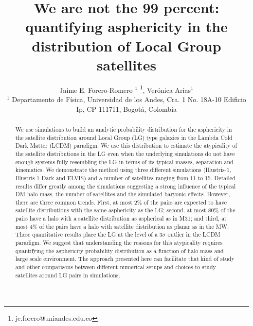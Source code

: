 \documentclass[a4paper,fleqn,usenatbib]{mnras}
\begin{document}
\title[LG satellites distribution asphericity]{We are not the 99 percent: quantifying
  asphericity in the distribution of Local Group satellites}
\author[J.E. Forero-Romero \& V. Arias]
{Jaime E. Forero-Romero $^{1}$ \thanks{je.forero@uniandes.edu.co},
Ver\'onica Arias$^1$\\
$^1$ Departamento de F\'isica, Universidad de los Andes, Cra. 1
  No. 18A-10 Edificio Ip, CP 111711, Bogot\'a, Colombia \\
}

\maketitle

\begin{abstract}
We use simulations to build an analytic probability distribution for
the asphericity in the satellite distribution around Local Group (LG)
type galaxies in the Lambda Cold Dark Matter (LCDM) paradigm. 
We use this distribution to estimate the  atypicality
of the satellite distributions in the LG even when the underlying
simulations do not have enough systems fully resembling the LG in
terms of its typical masses, separation and kinematics.
We demonstrate the method using three different simulations
(Illustris-1,  Illustris-1-Dark and ELVIS) and a number of satellites
ranging from 11 to 15.
Detailed results differ greatly among the simulations suggesting a
strong influence of the typical DM halo mass, the number of satellites
and the simulated baryonic effects.   
However, there are three common trends.
First, at most $2\%$ of the pairs are expected to have satellite
distributions with the same asphericity as the LG; second,
at most $80\%$ of the pairs have a halo with a satellite
distribution as aspherical as in M31; and third, at most $4\%$ of the
pairs have a halo with satellite distribution as planar as in the MW. 
These quantitative results place the LG at the level of a $3\sigma$
outlier in the LCDM paradigm. 
We suggest that understanding the reasons for this atypicality
requires quantifying the asphericity probability distribution as a
function of halo mass and large scale environment.
The approach presented here can facilitate that kind of study and other
comparisons between different numerical setups and choices to study
satellites around LG pairs in simulations.  
\end{abstract}
\end{document}
